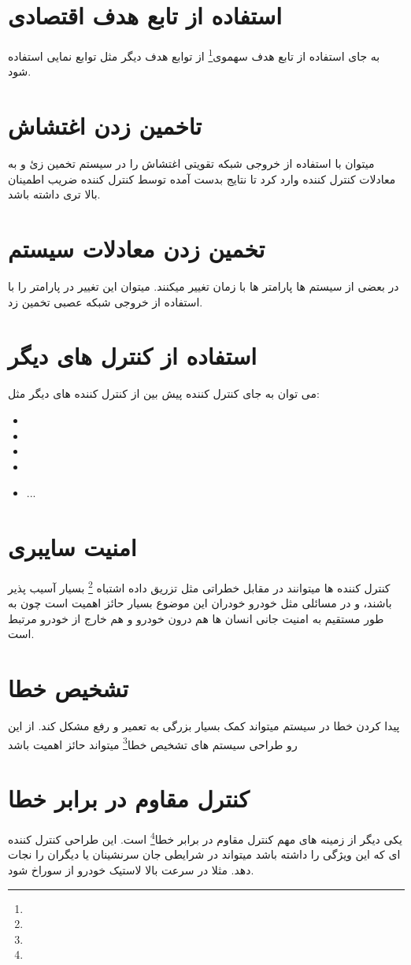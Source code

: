 \documentclass[12pt,a4paper]{report}
\begin{document}
	\section*{استفاده از تابع هدف اقتصادی}
	به جای استفاده از تابع هدف سهموی\footnote{} از توابع هدف دیگر مثل توابع نمایی استفاده شود.
	\section*{تاخمین زدن اغتشاش}
	میتوان با استفاده از خروجی شبکه تقویتی اغتشاش را در سیستم تخمین زئ و به معادلات کنترل کننده وارد کرد تا نتایج بدست آمده توسط کنترل کننده ضریب اطمینان بالا تری داشته باشد.
	\section*{تخمین زدن معادلات سیستم}
	در بعضی از سیستم ها پارامتر ها با زمان تغییر میکنند. میتوان این تغییر در پارامتر را با استفاده از خروجی شبکه عصبی تخمین زد.
	\section*{استفاده از کنترل های دیگر}
	می توان به جای کنترل کننده پیش بین از کنترل کننده های دیگر مثل:
	\begin{itemize}
		\item[\ding{70}] 
		\item[\ding{70}] 
		\item[\ding{70}] 
		\item[\ding{70}] 
		\item[\ding{70}] ...
	\end{itemize}
	\section*{امنیت سایبری}
	کنترل کننده ها میتوانند در مقابل خطراتی مثل تزریق داده اشتباه \footnote{} بسیار آسیب پذیر باشند، و در مسائلی مثل خودرو خودران این موضوع بسیار حائز اهمیت است چون به طور مستقیم به امنیت جانی انسان ها هم درون خودرو و هم خارج از خودرو مرتبط است.
	\section*{تشخیص خطا}
	پیدا کردن خطا در سیستم میتواند کمک بسیار بزرگی به تعمیر و رفع مشکل کند. از این رو طراحی سیستم های تشخیص خطا\footnote{} میتواند حائز اهمیت باشد
	\section*{کنترل مقاوم در برابر خطا}
	یکی دیگر از زمینه های مهم کنترل مقاوم در برابر خطا\footnote{} است. این طراحی کنترل کننده ای که این ویژگی را داشته باشد میتواند در شرایطی جان سرنشینان یا دیگران را نجات دهد. مثلا در سرعت بالا لاستیک خودرو از سوراخ شود.
	
\end{document}
